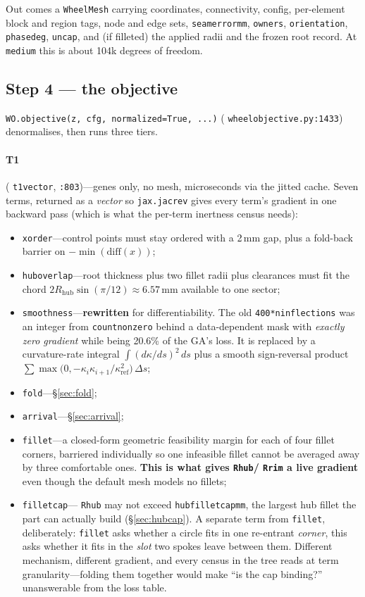 \documentclass[11pt,a4paper]{article}
\DeclareRobustCommand{\code}[1]{%
  \texttt{\small\def\_{\textunderscore\discretionary{}{}{}}#1}}
\newcommand{\at}[2]{\code{#1:#2}}
\begin{document}
Out comes a \code{WheelMesh} carrying coordinates, connectivity, config, per-element
block and region tags, node and edge sets, \code{seam\_error\_mm}, \code{owners},
\code{orientation}, \code{phase\_deg}, \code{uncap}, and (if filleted) the applied radii
and the frozen root record. At \code{medium} this is about 104k degrees of freedom.

\subsection*{Step 4 --- the objective}

\code{WO.objective(z, cfg, normalized=True, ...)} (\at{wheel\_objective.py}{1433})
denormalises, then runs three tiers.

\paragraph{T1} (\code{t1\_vector}, \code{:803})---genes only, no mesh, microseconds via
the jitted cache. Seven terms, returned as a \emph{vector} so \code{jax.jacrev} gives
every term's gradient in one backward pass (which is what the per-term inertness census
needs):

\begin{itemize}
\item \code{x\_order}---control points must stay ordered with a 2\,mm gap, plus a
  fold-back barrier on $-\min(\mathrm{diff}(x))$;
\item \code{hub\_overlap}---root thickness plus two fillet radii plus clearances must
  fit the chord $2 R_{\text{hub}}\sin(\pi/12) \approx 6.57$\,mm available to one sector;
\item \code{smoothness}---\textbf{rewritten} for differentiability. The old
  \code{400*n\_inflections} was an integer from \code{count\_nonzero} behind a
  data-dependent mask with \emph{exactly zero gradient} while being 20.6\% of the GA's
  loss. It is replaced by a curvature-rate integral $\int (d\kappa/ds)^2\,ds$ plus a
  smooth sign-reversal product
  $\sum \max\bigl(0, -\kappa_i \kappa_{i+1}/\kappa_{\text{ref}}^2\bigr)\,\Delta s$;
\item \code{fold}---\S\ref{sec:fold};
\item \code{arrival}---\S\ref{sec:arrival};
\item \code{fillet}---a closed-form geometric feasibility margin for each of four fillet
  corners, barriered individually so one infeasible fillet cannot be averaged away by
  three comfortable ones. \textbf{This is what gives \code{R\_hub}/\code{R\_rim} a live
  gradient} even though the default mesh models no fillets;
\item \code{fillet\_cap}---\code{R\_hub} may not exceed \code{hub\_fillet\_cap\_mm}, the
  largest hub fillet the part can actually build (\S\ref{sec:hubcap}). A separate term
  from \code{fillet}, deliberately: \code{fillet} asks whether a circle fits in one
  re-entrant \emph{corner}, this asks whether it fits in the \emph{slot} two spokes
  leave between them. Different mechanism, different gradient, and every census in the
  tree reads at term granularity---folding them together would make ``is the cap
  binding?'' unanswerable from the loss table.
\end{itemize}
\end{document}
